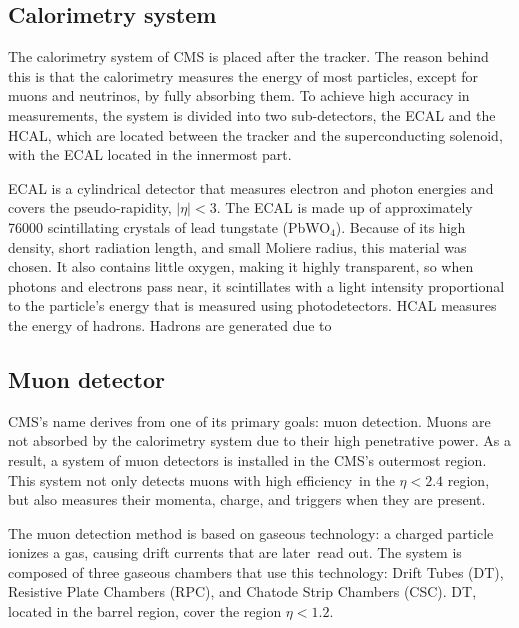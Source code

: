 \subsection{Calorimetry system}
The calorimetry system of CMS is placed after the tracker. The reason behind this is that the calorimetry measures the energy of most particles, except for muons and neutrinos, by fully absorbing them. To achieve high accuracy in measurements, the system is divided into two sub-detectors, the ECAL and the HCAL, which are located between the tracker and the superconducting solenoid, with the ECAL located in the innermost part.

ECAL is a cylindrical detector that measures electron and photon energies and covers the pseudo-rapidity, $|\eta| < 3$. The ECAL is made up of approximately 76000 scintillating crystals of lead tungstate (PbWO$_4$). Because of its high density, short radiation length, and small Moliere radius, this material was chosen. It also contains little oxygen, making it highly transparent, so when photons and electrons pass near, it scintillates with a light intensity proportional to the particle's energy that is measured using photodetectors.
HCAL measures the energy of hadrons. Hadrons are generated due to 
\subsection{Muon detector}
CMS's name derives from one of its primary goals: muon detection. Muons are not absorbed by the calorimetry system due to their high penetrative power. As a result, a system of muon detectors is installed in the CMS's outermost region. This system not only detects muons with high efficiency in the $\eta < 2.4$ region, but also measures their momenta, charge, and triggers when they are present.

The muon detection method is based on gaseous technology: a charged particle ionizes a gas, causing drift currents that are later read out. The system is composed of three gaseous chambers that use this technology: Drift Tubes (DT), Resistive Plate Chambers (RPC), and Chatode Strip Chambers (CSC).
DT, located in the barrel region, cover the region $\eta < 1.2$. 